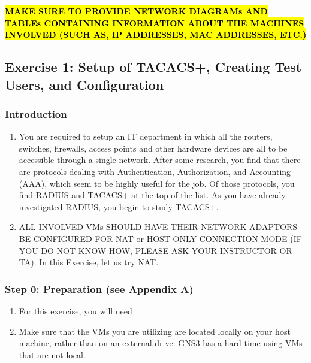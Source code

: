 \documentclass[main.tex]{subfiles}
\begin{document}
\hfill \break
\hl{\textbf{MAKE SURE TO PROVIDE NETWORK DIAGRAMs AND TABLEs CONTAINING INFORMATION ABOUT THE MACHINES INVOLVED (SUCH AS, IP ADDRESSES, MAC ADDRESSES, ETC.)}}
\subsection{Exercise 1: Setup of TACACS+, Creating Test Users, and Configuration}
\subsubsection{Introduction}

\begin{enumerate}[noitemsep,label=$\bullet$,leftmargin=20mm,labelsep=0.5cm]
\item You are required to setup an IT department in which all the routers, switches, firewalls, access points and other hardware devices are all to be accessible through a single network. After some research, you find that there are protocols dealing with Authentication, Authorization, and Accounting (AAA), which seem to be highly useful for the job. Of those protocols, you find RADIUS and TACACS+ at the top of the list. As you have already investigated RADIUS, you begin to study TACACS+. 


\item[] ALL INVOLVED VMs SHOULD HAVE THEIR NETWORK ADAPTORS BE CONFIGURED FOR NAT or HOST-ONLY CONNECTION MODE (IF YOU DO NOT KNOW HOW, PLEASE ASK YOUR INSTRUCTOR OR TA).  In this Exercise, let us try NAT.
\end{enumerate}

\subsubsection{Step 0: Preparation (see Appendix A)}
\begin{enumerate}[noitemsep,label=$\bullet$,leftmargin=20mm,labelsep=0.5cm]
\item For this exercise, you will need


\item Make sure that the VMs you are utilizing are located locally on your host machine, rather than on an external drive. GNS3 has a hard time using VMs that are not local.

\end{enumerate}
\end{document}
